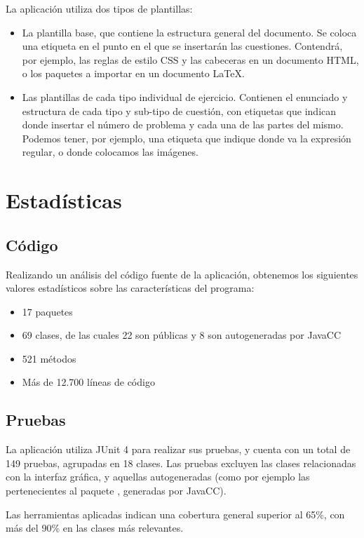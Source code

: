 La aplicación utiliza dos tipos de plantillas:
\begin{itemize}
	\item La plantilla base, que contiene la estructura general del documento.
	Se coloca una etiqueta en el punto en el que se insertarán las cuestiones.
	Contendrá, por ejemplo, las reglas de estilo CSS y las cabeceras en un documento HTML, o los paquetes a importar en un documento \LaTeX{}.
	\item Las plantillas de cada tipo individual de ejercicio.
	Contienen el enunciado y estructura de cada tipo y sub-tipo de cuestión, con etiquetas que indican donde insertar el número de problema y cada una de las partes del mismo.
	Podemos tener, por ejemplo, una etiqueta que indique donde va la expresión regular, o donde colocamos las imágenes.
\end{itemize}

\section{Estadísticas}
\subsection{Código}
Realizando un análisis del código fuente de la aplicación, obtenemos los siguientes valores estadísticos sobre las características del programa:
\begin{itemize}
	\item 17 paquetes
	\item 69 clases, de las cuales 22 son públicas y 8 son autogeneradas por JavaCC
	\item 521 métodos
	\item Más de 12.700 líneas de código
\end{itemize}

\subsection{Pruebas}
La aplicación utiliza JUnit 4 para realizar sus pruebas, y cuenta con un total de 149 pruebas, agrupadas en 18 clases.
Las pruebas excluyen las clases relacionadas con la interfaz gráfica, y aquellas autogeneradas (como por ejemplo las pertenecientes al paquete , generadas por JavaCC).

Las herramientas aplicadas indican una cobertura general superior al 65\%, con más del 90\% en las clases más relevantes.

